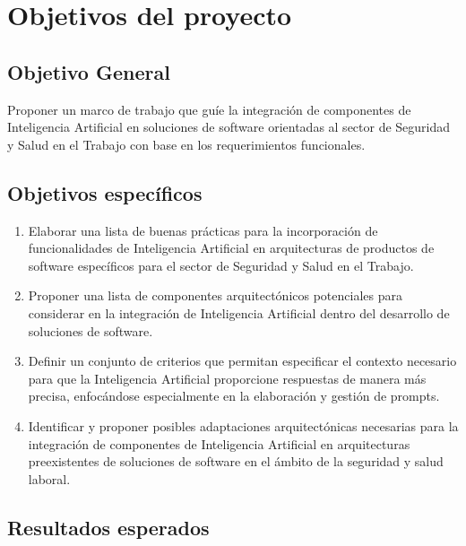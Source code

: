 \section{Objetivos del proyecto}
\label{sec:objetivos}
\subsection{Objetivo General}
 Proponer un marco de trabajo que guíe la integración de componentes de Inteligencia Artificial en soluciones de software orientadas al sector de Seguridad y Salud en el Trabajo con base en los requerimientos funcionales.


\subsection{Objetivos específicos}
\begin{enumerate}[label=\textbf{OE\arabic*:}]
    \item Elaborar una lista de buenas prácticas para la incorporación de funcionalidades de Inteligencia Artificial en arquitecturas de productos de software específicos para el sector de Seguridad y Salud en el Trabajo.
    \item Proponer una lista de componentes arquitectónicos potenciales para considerar en la integración de Inteligencia Artificial dentro del desarrollo de soluciones de software.
    \item Definir un conjunto de criterios que permitan especificar el contexto necesario para que la Inteligencia Artificial proporcione respuestas de manera más precisa, enfocándose especialmente en la elaboración y gestión de prompts.
    \item Identificar y proponer posibles adaptaciones arquitectónicas necesarias para la integración de componentes de Inteligencia Artificial en arquitecturas preexistentes de soluciones de software en el ámbito de la seguridad y salud laboral.
\end{enumerate}


\subsection{Resultados esperados}


